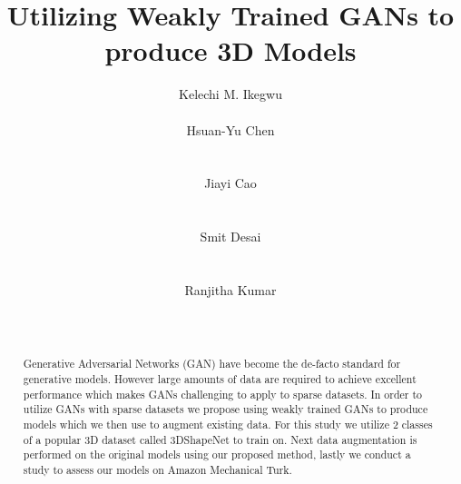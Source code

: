\documentclass{sigchi}
\begin{document}
\title{Utilizing Weakly Trained GANs to produce 3D Models}

\author{
  \alignauthor Kelechi M. Ikegwu\\
    \\
  \alignauthor Hsuan-Yu Chen\\
    \\
    \\
  \alignauthor Jiayi Cao\\
    \\
    \\
  \alignauthor Smit Desai\\
    \\
    \\
  \alignauthor Ranjitha Kumar\\
    \\
    \\  
}


\maketitle

\begin{abstract}
Generative Adversarial Networks (GAN) have become the de-facto standard for generative models. However large amounts of data are required to achieve excellent performance which makes GANs challenging to apply to sparse datasets. In order to utilize GANs with sparse datasets we propose using weakly trained GANs to produce models which we then use to augment existing data. For this study we utilize 2 classes of a popular 3D dataset called 3DShapeNet to train on. Next data augmentation is performed on the original models using our proposed method, lastly we conduct a study to assess our models on Amazon Mechanical Turk.

\end{abstract}
\end{document}
